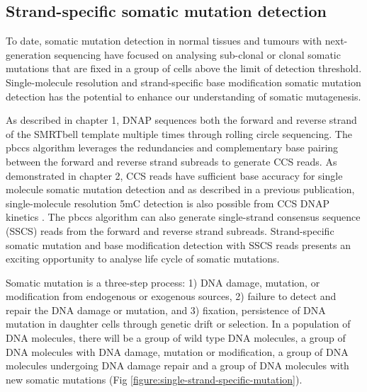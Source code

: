 \subsection{Strand-specific somatic mutation detection}

To date, somatic mutation detection in normal tissues and tumours with next-generation sequencing have focused on analysing sub-clonal or clonal somatic mutations that are fixed in a group of cells above the limit of detection threshold. Single-molecule resolution and strand-specific base modification somatic mutation detection has the potential to enhance our understanding of somatic mutagenesis.

As described in chapter 1, DNAP sequences both the forward and reverse strand of the SMRTbell template multiple times through rolling circle sequencing. The pbccs algorithm leverages the redundancies and complementary base pairing between the forward and reverse strand subreads to generate CCS reads. As demonstrated in chapter 2, CCS reads have sufficient base accuracy for single molecule somatic mutation detection and as described in a previous publication, single-molecule resolution 5mC detection is also possible from CCS DNAP kinetics \cite{Tse2021-or, Vong2019-bi}. The pbccs algorithm can also generate single-strand consensus sequence (SSCS) reads from the forward and reverse strand subreads. Strand-specific somatic mutation and base modification detection with SSCS reads presents an exciting opportunity to analyse life cycle of somatic mutations.

Somatic mutation is a three-step process: 1) DNA damage, mutation, or modification from endogenous or exogenous sources, 2) failure to detect and repair the DNA damage or mutation, and 3) fixation, persistence of DNA mutation in daughter cells through genetic drift or selection. In a population of DNA molecules, there will be a group of wild type DNA molecules, a group of DNA molecules with DNA damage, mutation or modification, a group of DNA molecules undergoing DNA damage repair and a group of DNA molecules with new somatic mutations (Fig \ref{figure:single-strand-specific-mutation}). 


